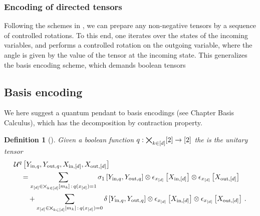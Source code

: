 \documentclass[aps,onecolumn,nofootinbib,pra]{article}
\newtheorem{definition}{Definition}
\begin{document}
    \subsubsection{Encoding of directed tensors}

    Following the schemes in \cite{low_quantum_2014}, we can prepare any non-negative tensors by a sequence of controlled rotations.
    To this end, one iterates over the states of the incoming variables, and performs a controlled rotation on the outgoing variable, where the angle is given by the value of the tensor at the incoming state.
    This generalizes the basis encoding scheme, which demands boolean tensors




    \subsection{Basis encoding}

    We here suggest a quantum pendant to basis encodings (see Chapter Basis Calculus), which has the decomposition by contraction property.

    \begin{definition}[\ComputationCircuit{}]
        Given a boolean function $q:\bigtimes_{k\in[d]}[2]\rightarrow[2]$ the \computationCircuit{} is the unitary tensor
        \begin{align*}
            &\mathcal{U}^{q}\left[Y_{\mathrm{in},q},Y_{\mathrm{out},q},X_{\mathrm{in},[d]},X_{\mathrm{out},[d]}\right] \\
            &\quad=
            \sum_{x_{[d]}\in\bigtimes_{k\in[d]}[m_{k}]\,:\,q(x_{[d]})=1}
            \sigma_1\left[Y_{\mathrm{in},q},Y_{\mathrm{out},q}\right] \otimes
            \epsilon_{x_{[d]}}\left[X_{\mathrm{in},[d]}\right] \otimes \epsilon_{x_{[d]}}\left[X_{\mathrm{out},[d]}\right] \\
            & \quad \quad +
            \sum_{x_{[d]}\in\bigtimes_{k\in[d]}[m_{k}]\,:\,q(x_{[d]})=0}
            \delta\left[Y_{\mathrm{in},q},Y_{\mathrm{out},q}\right] \otimes
            \epsilon_{x_{[d]}}\left[X_{\mathrm{in},[d]}\right] \otimes \epsilon_{x_{[d]}}\left[X_{\mathrm{out},[d]}\right] \, .
        \end{align*}
    \end{definition}
\end{document}
